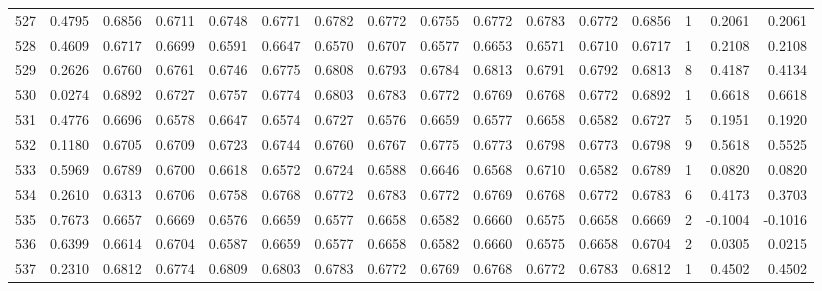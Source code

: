 \begin{tabular}{lrrrrrrrrrrrrrrr}
527 &      0.4795 &  0.6856 &  0.6711 &  0.6748 &  0.6771 &  0.6782 &  0.6772 &  0.6755 &  0.6772 &  0.6783 &   0.6772 &     0.6856 &      1 &                    0.2061 &                     0.2061 \\
528 &      0.4609 &  0.6717 &  0.6699 &  0.6591 &  0.6647 &  0.6570 &  0.6707 &  0.6577 &  0.6653 &  0.6571 &   0.6710 &     0.6717 &      1 &                    0.2108 &                     0.2108 \\
529 &      0.2626 &  0.6760 &  0.6761 &  0.6746 &  0.6775 &  0.6808 &  0.6793 &  0.6784 &  0.6813 &  0.6791 &   0.6792 &     0.6813 &      8 &                    0.4187 &                     0.4134 \\
530 &      0.0274 &  0.6892 &  0.6727 &  0.6757 &  0.6774 &  0.6803 &  0.6783 &  0.6772 &  0.6769 &  0.6768 &   0.6772 &     0.6892 &      1 &                    0.6618 &                     0.6618 \\
531 &      0.4776 &  0.6696 &  0.6578 &  0.6647 &  0.6574 &  0.6727 &  0.6576 &  0.6659 &  0.6577 &  0.6658 &   0.6582 &     0.6727 &      5 &                    0.1951 &                     0.1920 \\
532 &      0.1180 &  0.6705 &  0.6709 &  0.6723 &  0.6744 &  0.6760 &  0.6767 &  0.6775 &  0.6773 &  0.6798 &   0.6773 &     0.6798 &      9 &                    0.5618 &                     0.5525 \\
533 &      0.5969 &  0.6789 &  0.6700 &  0.6618 &  0.6572 &  0.6724 &  0.6588 &  0.6646 &  0.6568 &  0.6710 &   0.6582 &     0.6789 &      1 &                    0.0820 &                     0.0820 \\
534 &      0.2610 &  0.6313 &  0.6706 &  0.6758 &  0.6768 &  0.6772 &  0.6783 &  0.6772 &  0.6769 &  0.6768 &   0.6772 &     0.6783 &      6 &                    0.4173 &                     0.3703 \\
535 &      0.7673 &  0.6657 &  0.6669 &  0.6576 &  0.6659 &  0.6577 &  0.6658 &  0.6582 &  0.6660 &  0.6575 &   0.6658 &     0.6669 &      2 &                   -0.1004 &                    -0.1016 \\
536 &      0.6399 &  0.6614 &  0.6704 &  0.6587 &  0.6659 &  0.6577 &  0.6658 &  0.6582 &  0.6660 &  0.6575 &   0.6658 &     0.6704 &      2 &                    0.0305 &                     0.0215 \\
537 &      0.2310 &  0.6812 &  0.6774 &  0.6809 &  0.6803 &  0.6783 &  0.6772 &  0.6769 &  0.6768 &  0.6772 &   0.6783 &     0.6812 &      1 &                    0.4502 &                     0.4502 \\

\end{tabular}
